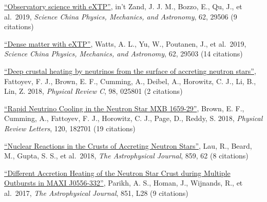 \documentclass[11pt]{vitae}
\begin{document}
\begin{publist}

\item \href{https://ui.adsabs.harvard.edu/#abs/2019SCPMA..6229506I/abstract}{``Observatory science with eXTP''}, in't Zand, J. J. M., Bozzo, E., Qu, J., et al.\ 2019, {\itshape Science China Physics, Mechanics, and Astronomy}, 62, 29506 (9 citations)

\item \href{https://ui.adsabs.harvard.edu/#abs/2019SCPMA..6229503W/abstract}{``Dense matter with eXTP''}, Watts, A. L., Yu, W., Poutanen, J., et al.\ 2019, {\itshape Science China Physics, Mechanics, and Astronomy}, 62, 29503 (14 citations)

\item \href{https://ui.adsabs.harvard.edu/#abs/2018PhRvC..98b5801F/abstract}{``Deep crustal heating by neutrinos from the surface of accreting neutron stars''}, Fattoyev, F. J., Brown, E. F., Cumming, A., Deibel, A., Horowitz, C. J., Li, B., Lin, Z. 2018, {\itshape Physical Review C}, 98, 025801 (2 citations)

\item \href{https://ui.adsabs.harvard.edu/#abs/2018PhRvL.120r2701B/abstract}{``Rapid Neutrino Cooling in the Neutron Star MXB 1659-29''}, Brown, E. F., Cumming, A., Fattoyev, F. J., Horowitz, C. J., Page, D., Reddy, S. 2018, {\itshape Physical Review Letters}, 120, 182701 (19 citations)

\item \href{https://ui.adsabs.harvard.edu/#abs/2018ApJ...859...62L/abstract}{``Nuclear Reactions in the Crusts of Accreting Neutron Stars''}, Lau, R., Beard, M., Gupta, S. S., et al.\ 2018, {\itshape The Astrophysical Journal}, 859, 62 (8 citations)

\item \href{https://ui.adsabs.harvard.edu/#abs/2017ApJ...851L..28P/abstract}{``Different Accretion Heating of the Neutron Star Crust during Multiple Outbursts in MAXI J0556-332''}, Parikh, A. S., Homan, J., Wijnands, R., et al.\ 2017, {\itshape The Astrophysical Journal}, 851, L28 (9 citations)

\end{publist}
\end{document}
